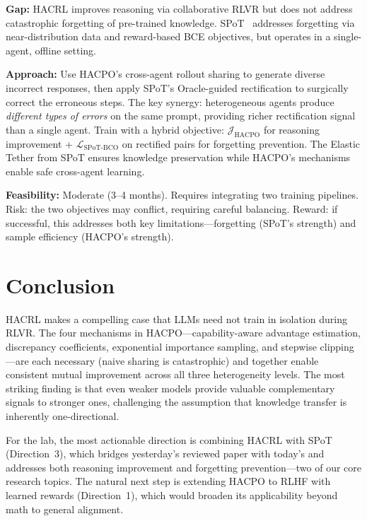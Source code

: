 \documentclass[11pt]{article}
\begin{document}
\textbf{Gap:} HACRL improves reasoning via collaborative RLVR but does not address catastrophic forgetting of pre-trained knowledge. SPoT~\citep{lin2026spot} addresses forgetting via near-distribution data and reward-based BCE objectives, but operates in a single-agent, offline setting.

\textbf{Approach:} Use HACPO's cross-agent rollout sharing to generate diverse incorrect responses, then apply SPoT's Oracle-guided rectification to surgically correct the erroneous steps. The key synergy: heterogeneous agents produce \emph{different types of errors} on the same prompt, providing richer rectification signal than a single agent. Train with a hybrid objective: $\mathcal{J}_{\text{HACPO}}$ for reasoning improvement + $\mathcal{L}_{\text{SPoT-BCO}}$ on rectified pairs for forgetting prevention. The Elastic Tether from SPoT ensures knowledge preservation while HACPO's mechanisms enable safe cross-agent learning.

\textbf{Feasibility:} Moderate (3--4 months). Requires integrating two training pipelines. Risk: the two objectives may conflict, requiring careful balancing. Reward: if successful, this addresses both key limitations---forgetting (SPoT's strength) and sample efficiency (HACPO's strength).

\section{Conclusion}

HACRL makes a compelling case that LLMs need not train in isolation during RLVR. The four mechanisms in HACPO---capability-aware advantage estimation, discrepancy coefficients, exponential importance sampling, and stepwise clipping---are each necessary (naive sharing is catastrophic) and together enable consistent mutual improvement across all three heterogeneity levels. The most striking finding is that even weaker models provide valuable complementary signals to stronger ones, challenging the assumption that knowledge transfer is inherently one-directional.

For the lab, the most actionable direction is combining HACRL with SPoT (Direction~3), which bridges yesterday's reviewed paper with today's and addresses both reasoning improvement and forgetting prevention---two of our core research topics. The natural next step is extending HACPO to RLHF with learned rewards (Direction~1), which would broaden its applicability beyond math to general alignment.
\end{document}

